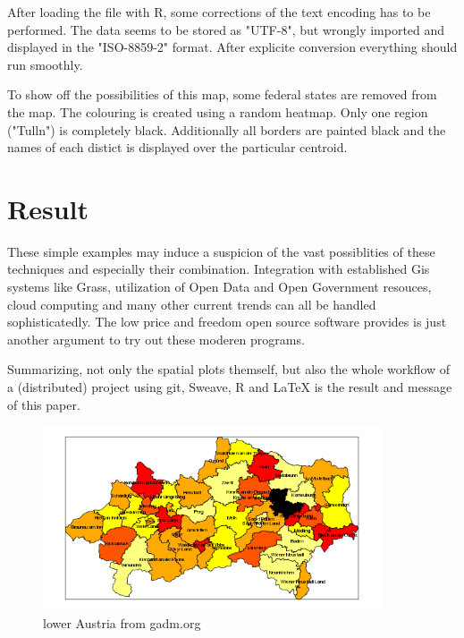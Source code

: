 \documentclass{ifacconf}
\begin{document}
After loading the file with R, some corrections of the text encoding has
to be performed. The data seems to be stored as "UTF-8", but wrongly
imported and displayed in the "ISO-8859-2" format. After explicite conversion
everything should run smoothly.

To show off the possibilities of this map, some federal states are removed from 
the map. The colouring is created using a random heatmap. Only one region ("Tulln")
is completely black. Additionally all borders are painted black and the names
of each distict is displayed over the particular centroid.



\section{Result}
These simple examples 
may induce a suspicion of the vast possiblities of these techniques and 
especially their combination. Integration with established Gis systems like Grass,
utilization of Open Data and Open Government resouces, cloud computing and many other 
current trends can all be handled sophisticatedly. The low price and
freedom open source software provides is just another argument to try out
these moderen programs.

Summarizing, not only the spatial plots themself, but also the whole workflow
of a (distributed) project using git, Sweave, R and LaTeX is the result and 
message of this paper.



\begin{figure}[h]
\begin{center}
\includegraphics[width=10cm]{pics/northAustria.png}    %
\caption{lower Austria from gadm.org} 
\label{fig:noe}
\end{center}
\end{figure}

   
\end{document}
